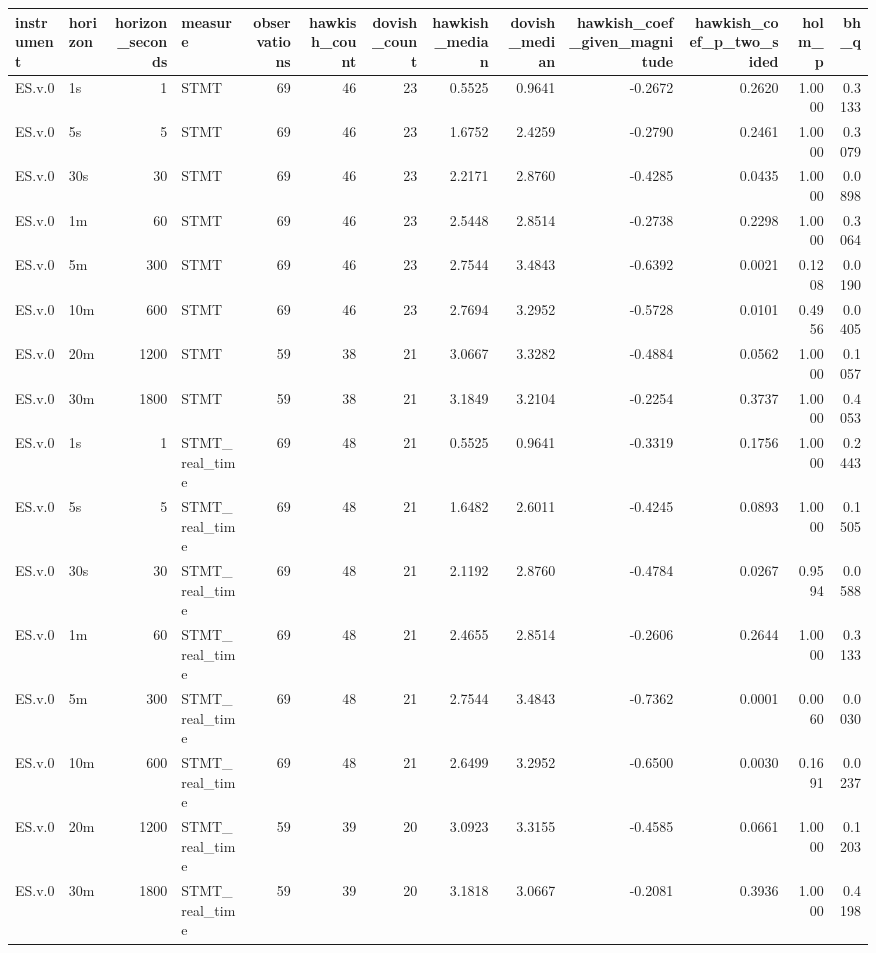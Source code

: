 \begin{tabular}{llrlrrrrrrrrr}
\toprule
instrument & horizon & horizon_seconds & measure & observations & hawkish_count & dovish_count & hawkish_median & dovish_median & hawkish_coef_given_magnitude & hawkish_coef_p_two_sided & holm_p & bh_q \\
\midrule
ES.v.0 & 1s & 1 & STMT & 69 & 46 & 23 & 0.5525 & 0.9641 & -0.2672 & 0.2620 & 1.0000 & 0.3133 \\
ES.v.0 & 5s & 5 & STMT & 69 & 46 & 23 & 1.6752 & 2.4259 & -0.2790 & 0.2461 & 1.0000 & 0.3079 \\
ES.v.0 & 30s & 30 & STMT & 69 & 46 & 23 & 2.2171 & 2.8760 & -0.4285 & 0.0435 & 1.0000 & 0.0898 \\
ES.v.0 & 1m & 60 & STMT & 69 & 46 & 23 & 2.5448 & 2.8514 & -0.2738 & 0.2298 & 1.0000 & 0.3064 \\
ES.v.0 & 5m & 300 & STMT & 69 & 46 & 23 & 2.7544 & 3.4843 & -0.6392 & 0.0021 & 0.1208 & 0.0190 \\
ES.v.0 & 10m & 600 & STMT & 69 & 46 & 23 & 2.7694 & 3.2952 & -0.5728 & 0.0101 & 0.4956 & 0.0405 \\
ES.v.0 & 20m & 1200 & STMT & 59 & 38 & 21 & 3.0667 & 3.3282 & -0.4884 & 0.0562 & 1.0000 & 0.1057 \\
ES.v.0 & 30m & 1800 & STMT & 59 & 38 & 21 & 3.1849 & 3.2104 & -0.2254 & 0.3737 & 1.0000 & 0.4053 \\
ES.v.0 & 1s & 1 & STMT_real_time & 69 & 48 & 21 & 0.5525 & 0.9641 & -0.3319 & 0.1756 & 1.0000 & 0.2443 \\
ES.v.0 & 5s & 5 & STMT_real_time & 69 & 48 & 21 & 1.6482 & 2.6011 & -0.4245 & 0.0893 & 1.0000 & 0.1505 \\
ES.v.0 & 30s & 30 & STMT_real_time & 69 & 48 & 21 & 2.1192 & 2.8760 & -0.4784 & 0.0267 & 0.9594 & 0.0588 \\
ES.v.0 & 1m & 60 & STMT_real_time & 69 & 48 & 21 & 2.4655 & 2.8514 & -0.2606 & 0.2644 & 1.0000 & 0.3133 \\
ES.v.0 & 5m & 300 & STMT_real_time & 69 & 48 & 21 & 2.7544 & 3.4843 & -0.7362 & 0.0001 & 0.0060 & 0.0030 \\
ES.v.0 & 10m & 600 & STMT_real_time & 69 & 48 & 21 & 2.6499 & 3.2952 & -0.6500 & 0.0030 & 0.1691 & 0.0237 \\
ES.v.0 & 20m & 1200 & STMT_real_time & 59 & 39 & 20 & 3.0923 & 3.3155 & -0.4585 & 0.0661 & 1.0000 & 0.1203 \\
ES.v.0 & 30m & 1800 & STMT_real_time & 59 & 39 & 20 & 3.1818 & 3.0667 & -0.2081 & 0.3936 & 1.0000 & 0.4198 \\

\end{tabular}
